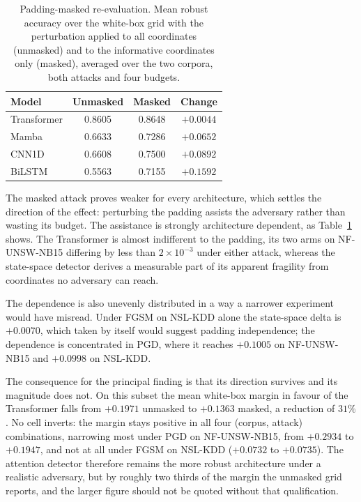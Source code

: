 \documentclass[11pt,a4paper]{article}
\begin{document}
\begin{table}[h]
\centering
\caption{Padding-masked re-evaluation. Mean robust accuracy over the
white-box grid with the perturbation applied to all coordinates
(unmasked) and to the informative coordinates only (masked), averaged
over the two corpora, both attacks and four budgets.}
\label{tab:padagg}
\small
\begin{tabular}{@{}lccc@{}}
\toprule
Model & Unmasked & Masked & Change \\
\midrule
Transformer & 0.8605 & 0.8648 & $+0.0044$ \\
Mamba       & 0.6633 & 0.7286 & $+0.0652$ \\
CNN1D       & 0.6608 & 0.7500 & $+0.0892$ \\
BiLSTM      & 0.5563 & 0.7155 & $+0.1592$ \\
\bottomrule
\end{tabular}
\end{table}

The masked attack proves weaker for every architecture, which settles
the direction of the effect: perturbing the padding assists the
adversary rather than wasting its budget. The assistance is strongly
architecture dependent, as Table~\ref{tab:padagg} shows. The
Transformer is almost indifferent to the padding, its two arms on
NF-UNSW-NB15 differing by less than $2\times10^{-3}$ under either
attack, whereas the state-space detector derives a measurable part of
its apparent fragility from coordinates no adversary can reach.

The dependence is also unevenly distributed in a way a narrower
experiment would have misread. Under FGSM on NSL-KDD alone the
state-space delta is $+0.0070$, which taken by itself would suggest
padding independence; the dependence is concentrated in PGD, where it
reaches $+0.1005$ on NF-UNSW-NB15 and $+0.0998$ on NSL-KDD.

The consequence for the principal finding is that its direction
survives and its magnitude does not. On this subset the mean white-box
margin in favour of the Transformer falls from $+0.1971$ unmasked to
$+0.1363$ masked, a reduction of $31\%$. No cell inverts: the margin
stays positive
in all four (corpus, attack) combinations, narrowing most under PGD on
NF-UNSW-NB15, from $+0.2934$ to $+0.1947$, and not at all under FGSM on
NSL-KDD ($+0.0732$ to $+0.0735$). The attention detector therefore
remains the more robust architecture under a realistic adversary, but
by roughly two thirds of the margin the unmasked grid reports, and the
larger figure should not be quoted without that qualification.
\end{document}
